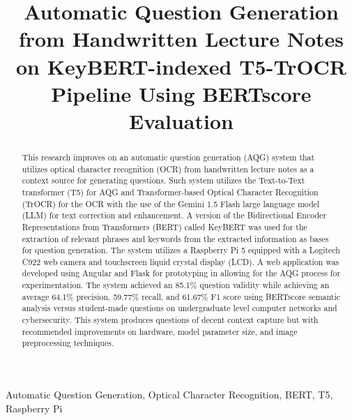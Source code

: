 \documentclass[conference]{IEEEtran}
\begin{document}
\title{Automatic Question Generation from Handwritten Lecture Notes on
KeyBERT-indexed T5-TrOCR Pipeline Using BERTscore Evaluation}
\author{
}

\maketitle

\begin{abstract}
This research improves on an automatic question generation (AQG) system 
that utilizes optical character recognition (OCR) from handwritten 
lecture notes as a context source for generating questions. Such system 
utilizes the Text-to-Text transformer (T5) for AQG and Transformer-based 
Optical Character Recognition (TrOCR) for the OCR with the use of 
the Gemini 1.5 Flash large language model (LLM) for text 
correction and enhancement. A version of the Bidirectional Encoder 
Representations from Transformers (BERT) called KeyBERT was used for 
the extraction of relevant phrases and keywords from the extracted 
information as bases for question generation. The system utilizes 
a Raspberry Pi 5 equipped with a Logitech C922 web camera and
touchscreen liquid crystal display (LCD). A web application was 
developed using Angular and Flask for prototyping in allowing for 
the AQG process for experimentation. The system achieved an 
85.1\% question validity while achieving an average 64.1\% precision, 
59.77\% recall, and 61.67\% F1 score using BERTscore semantic 
analysis versus student-made questions on undergraduate level computer networks and 
cybersecurity. This system produces questions of decent context capture 
but with recommended improvements on hardware, model parameter size, and 
image preprocessing techniques.
\end{abstract}
\begin{IEEEkeywords}
Automatic Question Generation, Optical Character Recognition,
BERT, T5, Raspberry Pi
\end{IEEEkeywords}
\end{document}
